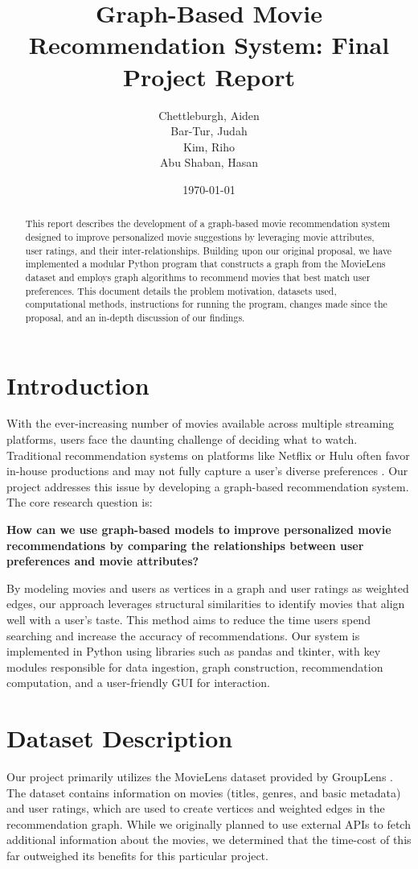\documentclass[12pt]{article}
\title{Graph-Based Movie Recommendation System: Final Project Report}
\author{
    Chettleburgh, Aiden \\
    Bar-Tur, Judah \\
    Kim, Riho \\
    Abu Shaban, Hasan
}
\date{\today}
\begin{document}
\maketitle

\begin{abstract}
This report describes the development of a graph-based movie recommendation system designed to improve personalized movie suggestions by leveraging movie attributes, user ratings, and their inter-relationships. Building upon our original proposal, we have implemented a modular Python program that constructs a graph from the MovieLens dataset and employs graph algorithms to recommend movies that best match user preferences. This document details the problem motivation, datasets used, computational methods, instructions for running the program, changes made since the proposal, and an in-depth discussion of our findings.
\end{abstract}

\section{Introduction}
With the ever-increasing number of movies available across multiple streaming platforms, users face the daunting challenge of deciding what to watch. Traditional recommendation systems on platforms like Netflix or Hulu often favor in-house productions and may not fully capture a user’s diverse preferences \cite{Netflix}. Our project addresses this issue by developing a graph-based recommendation system. The core research question is:

\begin{center}
\textbf{How can we use graph-based models to improve personalized movie recommendations by comparing the relationships between user preferences and movie attributes?}
\end{center}

By modeling movies and users as vertices in a graph and user ratings as weighted edges, our approach leverages structural similarities to identify movies that align well with a user’s taste. This method aims to reduce the time users spend searching and increase the accuracy of recommendations. Our system is implemented in Python using libraries such as pandas and tkinter, with key modules responsible for data ingestion, graph construction, recommendation computation, and a user-friendly GUI for interaction.

\section{Dataset Description}
Our project primarily utilizes the MovieLens dataset provided by GroupLens \cite{GroupLens}. The dataset contains information on movies (titles, genres, and basic metadata) and user ratings, which are used to create vertices and weighted edges in the recommendation graph. While we originally planned to use external APIs to fetch additional information about the movies, we determined that the time-cost of this far outweighed its benefits for this particular project.
\end{document}
